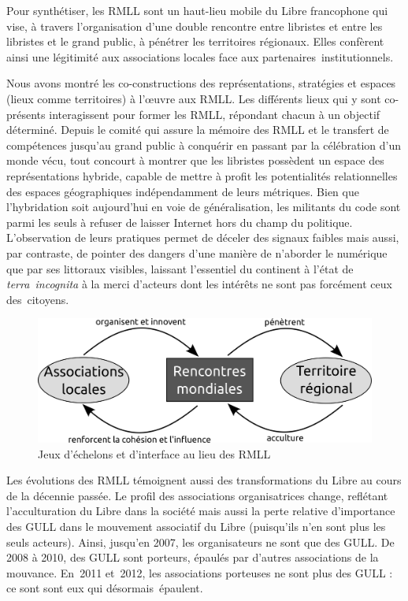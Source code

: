 \documentclass{FramateX}
\begin{document}
\begin{refsection}
Pour synthétiser, les RMLL sont un haut-lieu mobile du Libre francophone
qui vise, à travers l'organisation d'une double rencontre entre
libristes et entre les libristes et le grand public, à pénétrer les
territoires régionaux. Elles confèrent ainsi une légitimité aux
associations locales face aux partenaires~institutionnels.

Nous avons montré les co-constructions des représentations, stratégies
et espaces (lieux comme territoires) à l'œuvre aux RMLL. Les différents
lieux qui y sont co-présents interagissent pour former les RMLL,
répondant chacun à un objectif déterminé. Depuis le comité qui assure
la mémoire des RMLL et le transfert de compétences jusqu'au grand
public à conquérir en passant par la célébration d'un monde vécu, tout
concourt à montrer que les libristes possèdent un espace des
représentations hybride, capable de mettre à profit les potentialités
relationnelles des espaces géographiques indépendamment de leurs
métriques. Bien que l'hybridation soit aujourd'hui en voie de
généralisation, les militants du code sont parmi les seuls à refuser de
laisser Internet hors du champ du politique. L'observation de leurs
pratiques permet de déceler des signaux faibles mais aussi, par
contraste, de pointer des dangers d'une manière de n'aborder le
numérique que par ses littoraux visibles, laissant l'essentiel du
continent à l'état de \textit{terra~incognita} à la merci d'acteurs dont
les intérêts ne sont pas forcément ceux des~citoyens.

\begin{figure}
\centering
\includegraphics[scale=0.3]{images/images_PAGiraud/rmll_interface_revue.png} 
\caption{Jeux d'échelons et d'interface au lieu des RMLL}
\end{figure}

Les évolutions des RMLL témoignent aussi des transformations du Libre au
cours de la décennie passée. Le profil des associations organisatrices
change, reflétant l'acculturation du Libre dans la société mais aussi
la perte relative d'importance des GULL dans le mouvement associatif du
Libre (puisqu'ils n'en sont plus les seuls acteurs). Ainsi,
jusqu'en 2007, les organisateurs ne sont que des GULL. De 2008 à 2010,
des GULL sont porteurs, épaulés par d'autres associations de la
mouvance. En~2011 et~2012, les associations porteuses ne sont plus des
GULL : ce sont sont eux qui désormais~épaulent.


\end{refsection}
\end{document}
